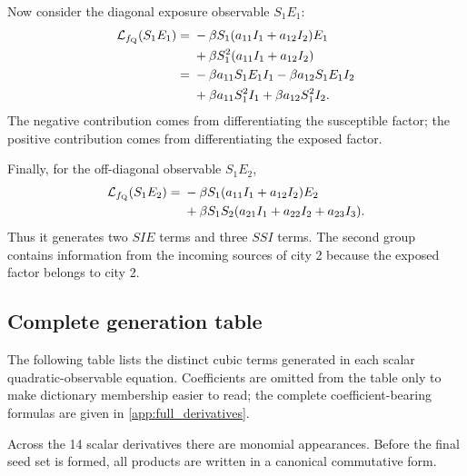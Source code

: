 Now consider the diagonal exposure observable $S_1E_1$:
\[
\begin{aligned}
\mathcal{L}_{f_{\mathrm Q}}(S_1E_1)
={}&-\beta S_1(a_{11}I_1+a_{12}I_2)E_1\\
&+\beta S_1^2(a_{11}I_1+a_{12}I_2)\\
={}&-\beta a_{11}S_1E_1I_1
   -\beta a_{12}S_1E_1I_2\\
&+\beta a_{11}S_1^2I_1
   +\beta a_{12}S_1^2I_2.
\end{aligned}
\]
The negative contribution comes from differentiating the susceptible factor;
the positive contribution comes from differentiating the exposed factor.

Finally, for the off-diagonal observable $S_1E_2$,
\[
\begin{aligned}
\mathcal{L}_{f_{\mathrm Q}}(S_1E_2)
={}&-\beta S_1(a_{11}I_1+a_{12}I_2)E_2\\
&+\beta S_1S_2(a_{21}I_1+a_{22}I_2+a_{23}I_3).
\end{aligned}
\]
Thus it generates two $SIE$ terms and three $SSI$ terms. The second group
contains information from the incoming sources of city 2 because the exposed
factor belongs to city 2.

\subsection{Complete generation table}

The following table lists the distinct cubic terms generated in each scalar
quadratic-observable equation. Coefficients are omitted from the table only to
make dictionary membership easier to read; the complete coefficient-bearing
formulas are given in \cref{app:full_derivatives}.



Across the 14 scalar derivatives there are \NumRawCubic{} monomial appearances.
Before the final seed set is formed, all products are written in a canonical
commutative form.
